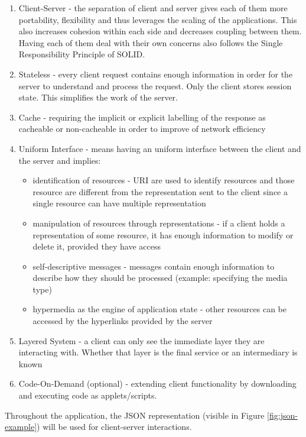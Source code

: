 \begin{enumerate}
    \item Client-Server - the separation of client and server gives each of them more portability, flexibility and thus leverages the scaling of the applications. This also increases cohesion within each side and decreases coupling between them. Having each of them deal with their own concerns also follows the Single Responsibility Principle of SOLID. 
    \item Stateless - every client request contains enough information in order for the server to understand and process the request. Only the client stores session state. This simplifies the work of the server.
    \item Cache - requiring the implicit or explicit labelling of the response as cacheable or non-cacheable in order to improve of network efficiency
    \item Uniform Interface - means having an uniform interface between the client and the server and implies:
    \begin{itemize}
    \item identification of resources - URI are used to identify resources and those resource are different from the representation sent to the client since a single resource can have multiple representation
    \item manipulation of resources through representations - if a client holds a representation of some resource, it has enough information to modify or delete it, provided they have access
    \item self-descriptive messages - messages contain enough information to describe how they should be processed (example: specifying the media type)
    \item hypermedia as the engine of application state - other resources can be accessed by the hyperlinks provided by the server
    \end{itemize}
    \item Layered System - a client can only see the immediate layer they are interacting with. Whether that layer is the final service or an intermediary is known
    \item Code-On-Demand (optional) - extending client functionality by downloading and executing code as applets/scripts.
\end{enumerate}

\par Throughout the application, the JSON representation (visible in Figure \ref{fig:json-example}) will be used for client-server interactions.

